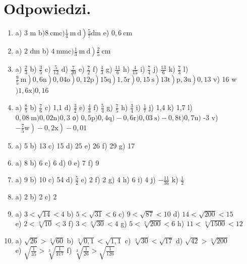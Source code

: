 \documentclass[10pt]{article}
\begin{document}
\section*{Odpowiedzi.}
\begin{enumerate}
  \item a) 3 m b\(\left.) 8 \mathrm{~cm} \mathrm{c}) \frac{1}{4} \mathrm{~m} \mathrm{~d}\right) \frac{5}{7} \mathrm{dm}\) e) \(0,6 \mathrm{~cm}\)
  \item a) 2 dm b) \(\left.4 \mathrm{~mm} \mathrm{c)} \frac{1}{3} \mathrm{~m} \mathrm{~d}\right) \frac{2}{5} \mathrm{~cm}\)
  \item a) \(\frac{2}{3}\) b) \(\frac{3}{5}\) c) \(\frac{5}{12}\) d) \(\frac{7}{20}\) e) \(\frac{7}{2}\) f) \(\frac{4}{3}\) g) \(\frac{11}{6}\) h) \(\frac{4}{15}\) i) \(\frac{7}{4}\) j) \(\frac{13}{6}\) k) \(\frac{7}{3}\) l) \(\left.\left.\left.\left.\left.\left.\left.\left.\left.\frac{9}{5} \mathrm{~m}\right) 0,6 \mathrm{n}\right) 0,04 \mathrm{o}\right) 0,12 \mathrm{p}\right) 15 \mathrm{q}\right) 1,5 \mathrm{r}\right) 0,15 \mathrm{~s}\right) 13 \mathrm{t}\right) \mathrm{p}, 3 \mathrm{u}\right) 0,13\) v) 16 w\() 1,6 \mathrm{x}) 0,16\)
  \item a) \(\frac{8}{5}\) b) \(\frac{7}{6}\) c) 1,1 d) \(\frac{3}{2}\) e) \(\frac{4}{3}\) f) \(\frac{5}{4}\) g) \(\frac{7}{5}\) h) \(\frac{3}{4}\) i) \(\frac{1}{7}\) j) 1,4 k) 1,7 l)\\
\(0,08 \mathrm{~m}) 0,02 \mathrm{n}) 0,3\) о) \(0,5 \mathrm{p}) 0,4 \mathrm{q})-0,6 \mathrm{r}) 0,03 \mathrm{~s})-0,8 \mathrm{t}) 0,7 \mathrm{u})\) -3 v) \(\left.\left.-\frac{7}{5} \mathrm{w}\right)-0,2 \mathrm{x}\right)-0,01\)
  \item a) 5 b) 13 c) 15 d) 25 e) 26 f) 29 g) 17
  \item a) 8 b) 6 c) 6 d) 0 e) 7 f) 9
  \item a) 9 b) 10 c) 54 d) \(\frac{5}{2}\) e) 2 f) 2 g) 4 h) 6 i) 4 j) \(-\frac{11}{36}\) k) \(\frac{1}{2}\)
  \item a) 2 b) 2 c) 2
  \item a) \(3<\sqrt{14}<4\) b) \(5<\sqrt{31}<6\) c) \(9<\sqrt{87}<10\) d) \(14<\sqrt{200}<15\)\\
e) \(2<\sqrt[3]{10}<3\) f) \(3<\sqrt[3]{30}<4\) g) \(5<\sqrt[3]{200}<6\) h) \(11<\sqrt[3]{1500}<12\)
  \item a) \(\sqrt{26}>\sqrt[3]{60}\) b) \(\sqrt[3]{0,1}<\sqrt{1,1}\) c) \(\sqrt[3]{30}<\sqrt{17}\) d) \(\sqrt{42}>\sqrt[3]{200}\)\\
e) \(\sqrt{\frac{1}{35}}>\sqrt[3]{\frac{1}{217}}\) f) \(\sqrt[3]{\frac{1}{26}}>\sqrt{\frac{1}{126}}\)

\end{enumerate}
\end{document}
